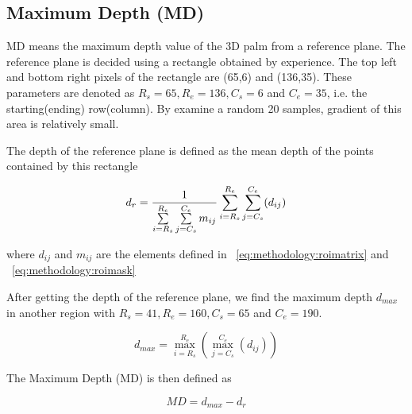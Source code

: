 \subsection{Maximum Depth (MD)}
\label{ssec:methodology:md}

MD means the maximum depth value of the 3D palm from a reference plane. The reference plane is decided using a rectangle obtained by experience. The top left and bottom right pixels of the rectangle are (65,6) and (136,35). These parameters are denoted as $R_s=65, R_e=136, C_s=6$ and $C_e=35$, i.e. the starting(ending) row(column). By examine a random 20 samples, gradient of this area is relatively small.

The depth of the reference plane is defined as the mean depth of the points contained by this rectangle

\begin{equation}
d_r = {1\over{
\sum \limits_{i=R_s}^{R_e} \sum \limits_{j=C_s}^{C_e} m_{ij}
}}
\sum \limits_{i=R_s}^{R_e} \sum \limits_{j=C_s}^{C_e} (d_{ij})
\end{equation}

where $d_{ij}$ and $m_{ij}$ are the elements defined in ~\ref{eq:methodology:roimatrix} and ~\ref{eq:methodology:roimask}

After getting the depth of the reference plane, we find the maximum depth $d_{max}$ in another region with $R_s=41, R_e=160, C_s=65$ and $C_e=190$.

\begin{equation}
d_{max} = \max \limits_{i=R_s}^{R_e} (\max \limits_{j=C_s}^{C_e} (d_{ij}) )
\end{equation}


The Maximum Depth (MD) is then defined as

\begin{equation}
\label{eq:methodology:md}
MD= d_{max} - d_r
\end{equation}
